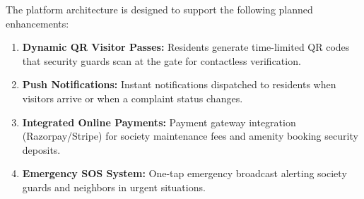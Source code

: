 \documentclass[a4paper,10pt]{scrartcl}
\numberwithin{figure}{section}
\begin{document}
The platform architecture is designed to support the following planned enhancements:
\begin{enumerate}
\item \textbf{Dynamic QR Visitor Passes:} Residents generate time-limited QR codes that security guards scan at the gate for contactless verification.
\item \textbf{Push Notifications:} Instant notifications dispatched to residents when visitors arrive or when a complaint status changes.
\item \textbf{Integrated Online Payments:} Payment gateway integration (Razorpay/Stripe) for society maintenance fees and amenity booking security deposits.
\item \textbf{Emergency SOS System:} One-tap emergency broadcast alerting society guards and neighbors in urgent situations.
\end{enumerate}
\end{document}
